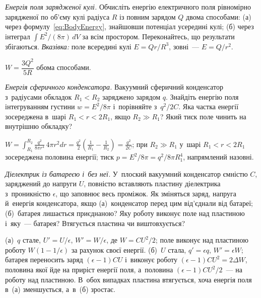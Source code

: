 \begin{problem}\label{prb:SphereEnergy}
	\emph{Енергія поля зарядженої кулі.} Обчисліть енергію електричного поля рівномірно
	зарядженої по об'єму кулі радіуса $R$ із повним зарядом $Q$ двома способами: (а) через
	формулу~\eqref{eq:BodyEnergy}, знайшовши потенціал усередині кулі; (б) через інтеграл
	$\int E^2/(8\pi)\, dV$ за всім простором. Переконайтесь, що результати збігаються. \emph{Вказівка:} поле
	всередині кулі $E = Qr/R^3$, зовні~--- $E = Q/r^2$.
	\begin{solution}
		$W=\dfrac{3Q^2}{5R}$ обома способами.
	\end{solution}
\end{problem}

\begin{problem}\label{prb:SphericalCapEnergy}
	\emph{Енергія сферичного конденсатора.} Вакуумний сферичний конденсатор з~радіусами
	обкладок $R_1<R_2$ заряджено зарядом $q$. Знайдіть енергію поля інтегруванням густини
	$w=E^2/8\pi$ і~порівняйте з~$q^2/2C$. Яка частка енергії зосереджена в~шарі
	$R_1<r<2R_1$, якщо $R_2\gg R_1$? Який тиск поле чинить на внутрішню обкладку?
	\begin{solution}
		$W=\displaystyle\int_{R_1}^{R_2}\frac{q^2}{8\pi r^4}\,4\pi r^2dr=\frac{q^2}{2}\left(\frac1{R_1}-\frac1{R_2}\right)=\frac{q^2}{2C}$; при $R_2\gg R_1$ у~шарі $R_1<r<2R_1$ зосереджена половина енергії; тиск $p=E^2/8\pi=q^2/8\pi R_1^4$, напрямлений назовні.
	\end{solution}
\end{problem}

\begin{problem}\label{prb:SlabBattery}
	\emph{Діелектрик із батареєю і~без неї.} У~плоский вакуумний конденсатор ємністю $C$,
	заряджений до напруги $U$, повністю вставляють пластину діелектрика з~проникністю
	$\epsilon$, що заповнює весь проміжок. Як зміняться заряд, напруга й~енергія
	конденсатора, якщо (а)~конденсатор перед цим від'єднали від батареї; (б)~батарея
	лишається приєднаною? Яку роботу виконує поле над пластиною і~яку~--- батарея?
	Втягується пластина чи виштовхується?
	\begin{solution}
		(а)~$q$ стале, $U'=U/\epsilon$, $W'=W/\epsilon$, де $W=CU^2/2$; поле виконує над пластиною роботу $W(1-1/\epsilon)$ за рахунок своєї енергії. (б)~$U$ стала, $q'=\epsilon q$, $W'=\epsilon W$; батарея переносить заряд $(\epsilon-1)CU$ і~виконує роботу $(\epsilon-1)CU^2=2\Delta W$, половина якої йде на приріст енергії поля, а~половина $(\epsilon-1)CU^2/2$~--- на роботу над пластиною. В~обох випадках пластина втягується, хоча енергія поля в~(а) зменшується, а~в~(б) зростає.
	\end{solution}
\end{problem}

